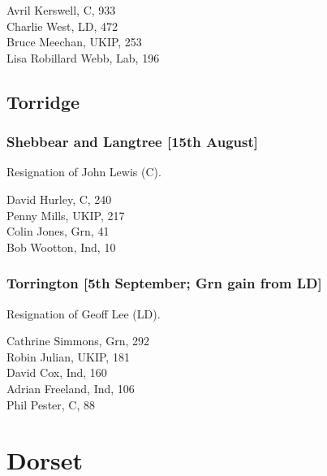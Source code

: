 \documentclass[a4paper,openany,10pt]{book}
\begin{document}
Avril Kerswell, C, 933\\
Charlie West, LD, 472\\
Bruce Meechan, UKIP, 253\\
Lisa Robillard Webb, Lab, 196\\


\subsection*{Torridge}

\subsubsection*{Shebbear and Langtree \hspace*{\fill}\nolinebreak[1]%
\enspace\hspace*{\fill}
[15th August]}


Resignation of John Lewis (C).



David Hurley, C, 240\\
Penny Mills, UKIP, 217\\
Colin Jones, Grn, 41\\
Bob Wootton, Ind, 10\\


\subsubsection*{Torrington \hspace*{\fill}\nolinebreak[1]%
\enspace\hspace*{\fill}
[5th September; Grn gain from LD]}


Resignation of Geoff Lee (LD).



Cathrine Simmons, Grn, 292\\
Robin Julian, UKIP, 181\\
David Cox, Ind, 160\\
Adrian Freeland, Ind, 106\\
Phil Pester, C, 88\\


\section{Dorset}
\end{document}
